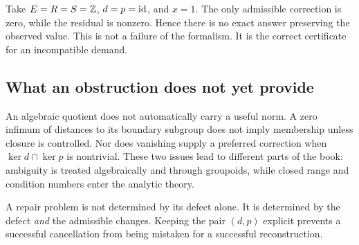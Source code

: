 \begin{example}
Take \(E=R=S=\mathbb Z\), \(d=p=\operatorname{id}\), and \(x=1\). The only admissible correction is zero, while the residual is nonzero. Hence there is no exact answer preserving the observed value. This is not a failure of the formalism. It is the correct certificate for an incompatible demand.
\end{example}

\subsection{What an obstruction does not yet provide}
An algebraic quotient does not automatically carry a useful norm. A zero infimum of distances to its boundary subgroup does not imply membership unless closure is controlled. Nor does vanishing supply a preferred correction when \(\ker d\cap\ker p\) is nontrivial. These two issues lead to different parts of the book: ambiguity is treated algebraically and through groupoids, while closed range and condition numbers enter the analytic theory.

\begin{insight}
A repair problem is not determined by its defect alone. It is determined by the defect \emph{and} the admissible changes. Keeping the pair \((d,p)\) explicit prevents a successful cancellation from being mistaken for a successful reconstruction.
\end{insight}
